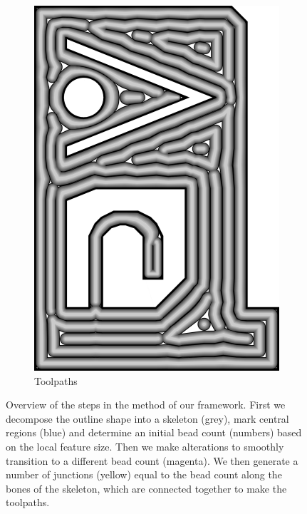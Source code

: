 \begin{figure}
\begin{subfigure}{\figwidth}
\includegraphics[width=\columnwidth]{sources/method/overview/toolpaths.png}
\caption{Toolpaths}\label{overview_fig_toolpaths}
\end{subfigure}
\caption{
Overview of the steps in the method of our framework.
First we  decompose the outline shape into a skeleton (grey),  mark central regions (blue) and determine an initial bead count (numbers) based on the local feature size.
Then we  make alterations to smoothly transition to a different bead count (magenta).
We then  generate a number of junctions (yellow) equal to the bead count along the bones of the skeleton,
which are  connected together to make the toolpaths.
}
\label{overview_fig}
\end{figure}

